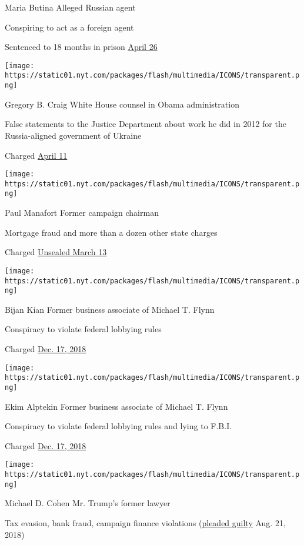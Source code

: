 Maria Butina Alleged Russian agent

Conspiring to act as a foreign agent

Sentenced to 18 months in prison
\href{https://www.nytimes.com/2019/04/26/us/politics/maria-butina-sentence-russia.html}{April
26}

\texttt{[image: https://static01.nyt.com/packages/flash/multimedia/ICONS/transparent.png]}

Gregory B. Craig White House counsel in Obama administration

False statements to the Justice Department about work he did in 2012 for
the Russia-aligned government of Ukraine

Charged
\href{https://www.nytimes.com/2019/04/11/us/politics/gregory-craig-indictment.html}{April
11}

\texttt{[image: https://static01.nyt.com/packages/flash/multimedia/ICONS/transparent.png]}

Paul Manafort Former campaign chairman

Mortgage fraud and more than a dozen other state charges

Charged
\href{https://www.nytimes.com/2019/03/13/nyregion/manafort-indictment.html?action=click\&module=Top\%20Stories\&pgtype=Homepage}{Unsealed
March 13}

\texttt{[image: https://static01.nyt.com/packages/flash/multimedia/ICONS/transparent.png]}

Bijan Kian Former business associate of Michael T. Flynn

Conspiracy to violate federal lobbying rules

Charged
\href{https://www.nytimes.com/2018/12/17/us/politics/flynn-turkey-bijan-kian.html}{Dec.
17, 2018}

\texttt{[image: https://static01.nyt.com/packages/flash/multimedia/ICONS/transparent.png]}

Ekim Alptekin Former business associate of Michael T. Flynn

Conspiracy to violate federal lobbying rules and lying to F.B.I.

Charged
\href{https://www.nytimes.com/2018/12/17/us/politics/flynn-turkey-bijan-kian.html}{Dec.
17, 2018}

\texttt{[image: https://static01.nyt.com/packages/flash/multimedia/ICONS/transparent.png]}

Michael D. Cohen Mr. Trump's former lawyer

Tax evasion, bank fraud, campaign finance violations
(\href{https://www.nytimes.com/2018/08/21/nyregion/michael-cohen-plea-deal-trump.html}{pleaded
guilty} Aug. 21, 2018)

